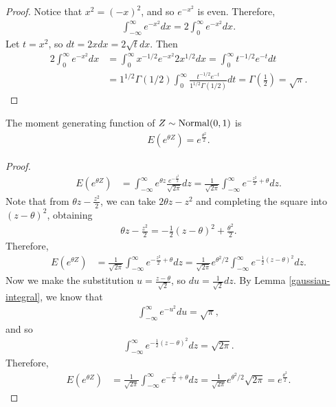 \begin{proof}
    Notice that $x^2 = (-x)^2$, and so $e^{-x^2}$ is even. Therefore,
    \begin{align*}
        \int_{-\infty}^{\infty}e^{-x^2}dx = 2\int_{0}^{\infty}e^{-x^2}dx.
    \end{align*}
    Let $t = x^2$, so $dt = 2xdx = 2\sqrt{t}dx$. Then
    \begin{align*}
        2\int_{0}^{\infty}e^{-x^2}dx &= \int_{0}^{\infty}x^{-1/2}e^{-x^2}2x^{1/2}dx = \int_{0}^{\infty}t^{-1/2}e^{-t}dt \\
        &= 1^{1/2}\Gamma(1/2)\int_{0}^{\infty}\frac{t^{-1/2}e^{-t}}{1^{1/2}\Gamma(1/2)}dt = \Gamma\left(\frac{1}{2}\right) = \sqrt{\pi}.
    \end{align*}
\end{proof}

\begin{thm}
    The moment generating function of $Z \sim \mathrm{Normal}(0, 1)$ is
    \begin{align*}
        E\left(e^{\theta Z}\right) = e^{\frac{\theta^2}{2}}.
    \end{align*}
\end{thm}

\begin{proof}
    \begin{align*}
        E\left(e^{\theta Z}\right) &= \int_{-\infty}^{\infty}e^{\theta z}\frac{e^{-\frac{z^2}{2}}}{\sqrt{2\pi}}dz = \frac{1}{\sqrt{2\pi}}\int_{-\infty}^{\infty}e^{-\frac{z^2}{2}+\theta}dz.
    \end{align*}
    Note that from $\theta z - \frac{z^2}{2}$, we can take $2\theta z - z^2$ and completing the square into $(z - \theta)^2$, obtaining
    \begin{align*}
        \theta z - \frac{z^2}{2} = -\frac{1}{2}\left(z - \theta\right)^2 + \frac{\theta^2}{2}.
    \end{align*}
    Therefore,
    \begin{align*}
        E\left(e^{\theta Z}\right) &= \frac{1}{\sqrt{2\pi}}\int_{-\infty}^{\infty}e^{-\frac{z^2}{2}+\theta}dz = \frac{1}{\sqrt{2\pi}}e^{\theta^2/2}\int_{-\infty}^{\infty}e^{-\frac{1}{2}\left(z - \theta\right)^2}dz.
    \end{align*}
    Now we make the substitution $u = \frac{z - \theta}{\sqrt{2}}$, so $du = \frac{1}{\sqrt{2}}dz$. By Lemma \ref{gaussian-integral}, we know that
    \begin{align*}
        \int_{-\infty}^{\infty}e^{-u^2}du = \sqrt{\pi},
    \end{align*}
    and so
    \begin{align*}
        \int_{-\infty}^{\infty}e^{-\frac{1}{2}\left(z - \theta\right)^2}dz = \sqrt{2\pi}.
    \end{align*}
    Therefore,
    \begin{align*}
        E\left(e^{\theta Z}\right) &= \frac{1}{\sqrt{2\pi}}\int_{-\infty}^{\infty}e^{-\frac{z^2}{2}+\theta}dz = \frac{1}{\sqrt{2\pi}}e^{\theta^2/2}\sqrt{2\pi} = e^{\frac{\theta^2}{2}}.
    \end{align*}
\end{proof}

